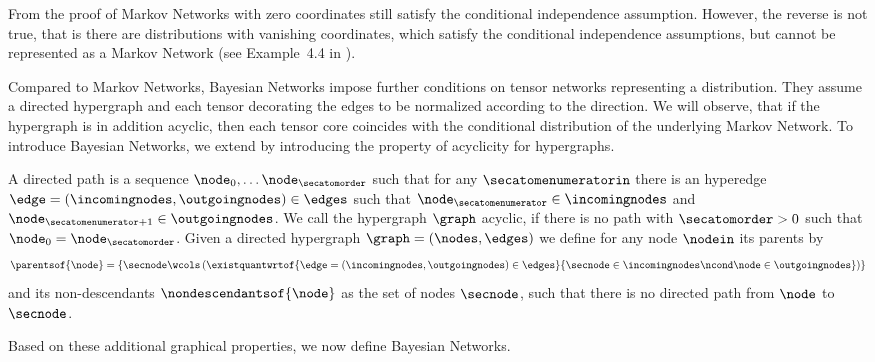 From the proof of  Markov Networks with zero coordinates still satisfy the conditional independence assumption.
However, the reverse is not true, that is there are distributions with vanishing coordinates, which satisfy the conditional independence assumptions, but cannot be represented as a Markov Network (see Example~4.4 in \cite{koller_probabilistic_2009}).








Compared to Markov Networks, Bayesian Networks impose further conditions on tensor networks representing a distribution.
They assume a directed hypergraph and each tensor decorating the edges to be normalized according to the direction.
We will observe, that if the hypergraph is in addition acyclic, then each tensor core coincides with the conditional distribution of the underlying Markov Network.
To introduce Bayesian Networks, we extend  by introducing the property of acyclicity for hypergraphs.

\begin{definition}
    A directed path is a sequence $\node_{0},\ldots\node_{\secatomorder}$ such that for any $\secatomenumeratorin$ there is an hyperedge $\edge=(\incomingnodes,\outgoingnodes)\in\edges$ such that $\node_{\secatomenumerator}\in\incomingnodes$ and $\node_{\secatomenumerator+1}\in\outgoingnodes$.
    We call the hypergraph $\graph$ acyclic, if there is no path with $\secatomorder>0$ such that $\node_{0}=\node_{\secatomorder}$.
    Given a directed hypergraph $\graph=(\nodes,\edges)$ we define for any node $\nodein$ its parents by
    \begin{align*}
        \parentsof{\node} = \left\{\secnode\wcols\left(
                                                     \existquantwrtof{\edge=(\incomingnodes,\outgoingnodes)\in\edges}{\secnode\in\incomingnodes\ncond\node\in\outgoingnodes}
        \right)\right\}
    \end{align*}
    and its non-descendants $\nondescendantsof{\node}$ as the set of nodes $\secnode$, such that there is no directed path from $\node$ to $\secnode$.
\end{definition}

Based on these additional graphical properties, we now define Bayesian Networks.


